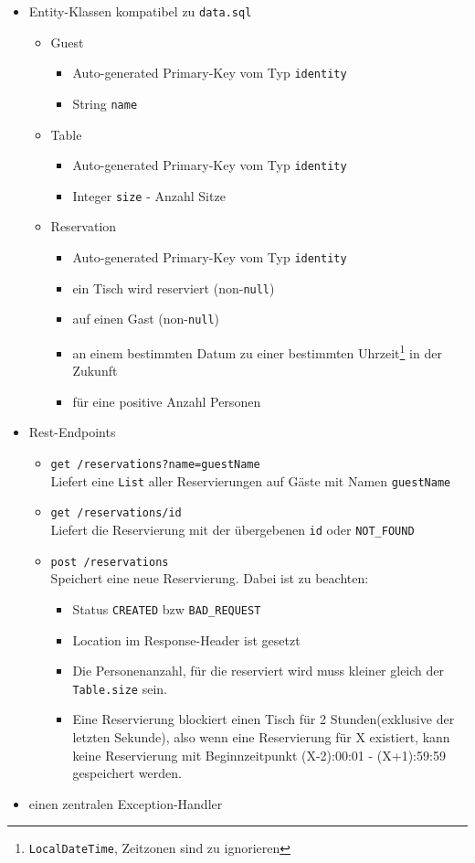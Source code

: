 \begin{itemize}
	\item Entity-Klassen kompatibel zu \texttt{data.sql}
	\begin{itemize}
		\item Guest 
		\begin{itemize}
			\item Auto-generated Primary-Key vom Typ \texttt{identity}
			\item String \texttt{name}
		\end{itemize}
		\item Table
		\begin{itemize}
			\item Auto-generated Primary-Key vom Typ \texttt{identity}
			\item Integer \texttt{size} - Anzahl Sitze
		\end{itemize}
		\item Reservation
		\begin{itemize}
			\item Auto-generated Primary-Key vom Typ \texttt{identity}
			\item ein Tisch wird reserviert (non-\texttt{null})
			\item auf einen Gast (non-\texttt{null})
			\item an einem bestimmten Datum zu einer bestimmten Uhrzeit\footnote{\texttt{LocalDateTime}, Zeitzonen sind zu ignorieren} in der Zukunft
			\item für eine positive Anzahl Personen
		\end{itemize}
	\end{itemize}
	\item Rest-Endpoints
	\begin{itemize}
		\item \texttt{get /reservations?name=guestName}\\
		Liefert eine \texttt{List} aller Reservierungen auf Gäste mit Namen \texttt{guestName}
		\item \texttt{get /reservations/{id}}\\
		Liefert die Reservierung mit der übergebenen \texttt{id} oder \texttt{NOT\_FOUND}
		\item \texttt{post /reservations}\\
		Speichert eine neue Reservierung. Dabei ist zu beachten:
		\begin{itemize}
			\item Status \texttt{CREATED} bzw \texttt{BAD\_REQUEST}
			\item Location im Response-Header ist gesetzt
			\item Die Personenanzahl, für die reserviert wird muss kleiner gleich der \texttt{Table.size} sein.
			\item Eine Reservierung blockiert einen Tisch für 2 Stunden(exklusive der letzten Sekunde), also wenn eine Reservierung für X existiert, kann keine Reservierung mit Beginnzeitpunkt (X-2):00:01 - (X+1):59:59 gespeichert werden.
		\end{itemize}
	\end{itemize}
	\item einen zentralen Exception-Handler
\end{itemize}

